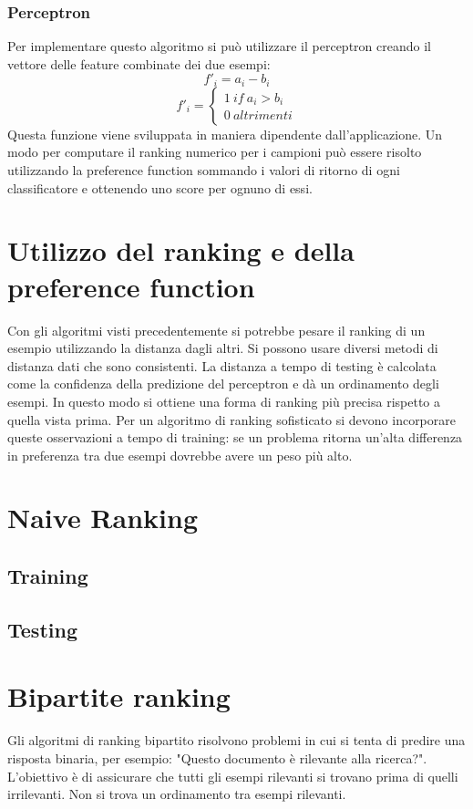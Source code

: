 		\subsubsection{Perceptron}
		Per implementare questo algoritmo si pu\`o utilizzare il perceptron creando il vettore delle feature combinate dei due esempi:
		$$f'_i = a_i -b_i$$
		$$f'_i = \begin{cases}1\ if\ a_i > b_i\\0\ altrimenti\end{cases}$$
		Questa funzione viene sviluppata in maniera dipendente dall'applicazione.
		Un modo per computare il ranking numerico per i campioni pu\`o essere risolto utilizzando la preference function sommando i valori di ritorno di ogni classificatore e ottenendo uno score per ognuno di essi.

\section{Utilizzo del ranking e della preference function}
Con gli algoritmi visti precedentemente si potrebbe pesare il ranking di un esempio utilizzando la distanza dagli altri.
Si possono usare diversi metodi di distanza dati che sono consistenti.
La distanza a tempo di testing \`e calcolata come la confidenza della predizione del perceptron e d\`a un ordinamento degli esempi.
In questo modo si ottiene una forma di ranking pi\`u precisa rispetto a quella vista prima.
Per un algoritmo di ranking sofisticato si devono incorporare queste osservazioni a tempo di training: se un problema ritorna un'alta differenza in preferenza tra due esempi dovrebbe avere un peso pi\`u alto.

\section{Naive Ranking}

	\subsection{Training}
	

	\subsection{Testing}
	

\section{Bipartite ranking}
Gli algoritmi di ranking bipartito risolvono problemi in cui si tenta di predire una risposta binaria, per esempio: "Questo documento \`e rilevante alla ricerca?".
L'obiettivo \`e di assicurare che tutti gli esempi rilevanti si trovano prima di quelli irrilevanti.
Non si trova un ordinamento tra esempi rilevanti.


